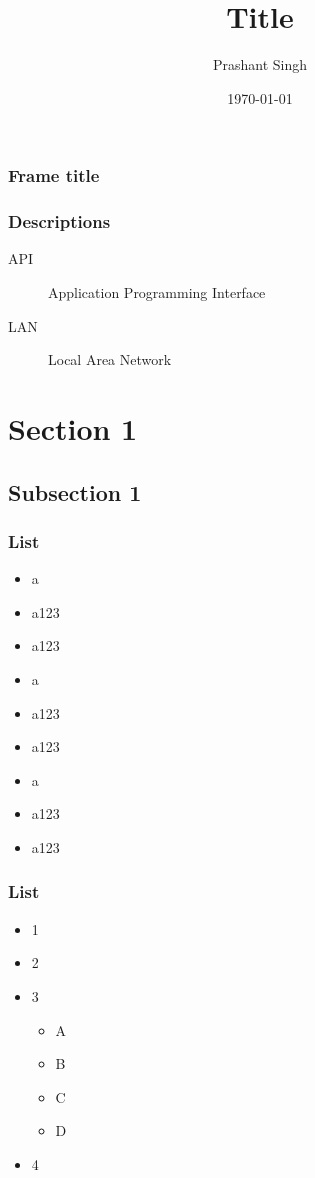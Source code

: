 \documentclass{beamer}
\title{Title}
\author{Prashant Singh}
\institute{NIT Durgapur}
\date{\today}
\begin{document}
\begin{frame}
\titlepage

\end{frame}

\begin{frame}
\frametitle{Frame title}
\tableofcontents
\end{frame}

\begin{frame}
\frametitle{Descriptions}
\begin{description}
\item[API] Application Programming Interface
\item[LAN] Local Area Network
\end{description}
\end{frame}

\section{Section 1}
\subsection{Subsection 1}

\begin{frame}
\frametitle{List}
\begin{itemize}
\item a
\item a123
\item a123
\item a
\item a123
\item a123
\item a
\item a123
\item a123
\end{itemize}
\end{frame}


\begin{frame}
\frametitle{List}
\begin{itemize}
\item 1
\item 2
\item 3
\begin{itemize}
\item A
\item B
\item C
\item D
\end{itemize}
\item 4
\end{itemize}
\end{frame}
\end{document}
